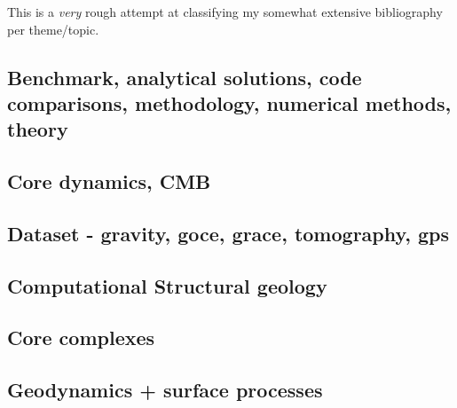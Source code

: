 This is a {\it very} rough attempt at classifying my somewhat extensive 
bibliography per theme/topic.
 


\subsection*{Benchmark, analytical solutions, code comparisons, methodology, numerical methods, theory}

\cite{yusa84}
\cite{trab90}
\cite{zhon96}
\cite{rist97}
\cite{lind99}
\cite{taki03}
\cite{toma07}
\cite{zhmt08}\cite{deka08}\cite{trub08}
\cite{dumg11}
\cite{thmk14}
\cite{lelk15}\cite{rumi15}
\cite{dumy16}
\cite{robh17}\cite{wisv17}
\cite{clhe19}

\subsection*{Core dynamics, CMB}

\cite{hayu96}
\cite{lahb08}

\subsection*{Dataset - gravity, goce, grace, tomography, gps}

\cite{dzan81}
\cite{krhh03}
\cite{hawj12}
\cite{ress13}
\cite{paml14}

\subsection*{Computational Structural geology}

\cite{acgf00}
\cite{trla00}

\subsection*{Core complexes}

\cite{lehm12}

\subsection*{Geodynamics + surface processes}

